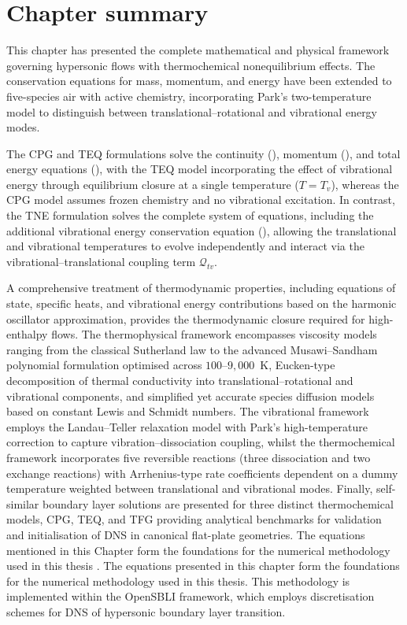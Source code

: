 \section*{Chapter summary}

This chapter has presented the complete mathematical and physical framework governing hypersonic flows with thermochemical nonequilibrium effects. The conservation equations for mass, momentum, and energy have been extended to five-species air with active chemistry, incorporating Park's two-temperature model to distinguish between translational--rotational and vibrational energy modes.

The \gls{CPG} and \gls{TEQ} formulations solve the continuity (), momentum (), and total energy equations (), with the \gls{TEQ} model incorporating the effect of vibrational energy through equilibrium closure at a single temperature ($T = T_v$), whereas the \gls{CPG} model assumes frozen chemistry and no vibrational excitation. In contrast, the \gls{TNE} formulation solves the complete system of equations, including the additional vibrational energy conservation equation (), allowing the translational and vibrational temperatures to evolve independently and interact via the vibrational--translational coupling term $\mathcal{Q}_{tv}$.

A comprehensive treatment of thermodynamic properties, including equations of state, specific heats, and vibrational energy contributions based on the harmonic oscillator approximation, provides the thermodynamic closure required for high-enthalpy flows. The thermophysical framework encompasses viscosity models ranging from the classical Sutherland law to the advanced Musawi--Sandham polynomial formulation optimised across $100$--$9,000$~\si{\kelvin}, Eucken-type decomposition of thermal conductivity into translational--rotational and vibrational components, and simplified yet accurate species diffusion models based on constant Lewis and Schmidt numbers. The vibrational framework employs the Landau--Teller relaxation model with Park's high-temperature correction to capture vibration--dissociation coupling, whilst the thermochemical framework incorporates five reversible reactions (three dissociation and two exchange reactions) with Arrhenius-type rate coefficients dependent on a dummy temperature weighted between translational and vibrational modes. Finally, self-similar boundary layer solutions are presented for three distinct thermochemical models, \gls{CPG}, \gls{TEQ}, and \gls{TFG} providing analytical benchmarks for validation and initialisation of \gls{DNS} in canonical flat-plate geometries. The equations mentioned in this Chapter form the foundations for the numerical methodology used in this thesis . The equations presented in this chapter form the foundations for the numerical methodology used in this thesis. This methodology is implemented within the OpenSBLI framework, which employs discretisation schemes for \gls{DNS} of hypersonic boundary layer transition.

